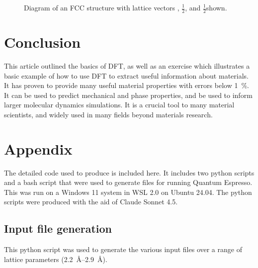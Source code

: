 \begin{figure}[t]
\centering

\caption{Diagram of an FCC structure with lattice vectors
\hkl[011], $\frac{1}{2}$\hkl[101], and $\frac{1}{2}$\hkl[110] shown.}
\label{fig:fcc}
\end{figure}

\section{Conclusion}

This article outlined the basics of DFT, as well as an
exercise which illustrates a basic example of how to use DFT to extract useful
information about materials. It has proven to provide
many useful material properties with errors below \SI{1}{\percent}. It can be
used to predict mechanical and phase properties, and be used to inform
larger molecular dynamics simulations. It is a crucial tool to many material
scientists, and widely used in many fields beyond materials research.

\pagebreak

\printbibliography

\pagebreak

\section{Appendix}
\label{sec:appendix}

The detailed code used to produce  is included
here. It includes
two python scripts and a bash script that were used to generate files for
running Quantum Espresso. This was run on a Windows 11 system in WSL 2.0
on Ubuntu 24.04. The python scripts were produced with
the aid of Claude Sonnet 4.5.

\pagebreak

\subsection{Input file generation}

This python script was used to generate the various input files
over a range of lattice parameters (\SI{2.2}{\angstrom}--\SI{2.9}{\angstrom}).

\begin{tcolorbox}[colback=gray!10, colframe=gray!30, boxrule=0.5pt, breakable]
\begin{center}
  \inputminted[linenos,
  numbersep=8pt, fontsize=\small]{python}{./calculations/generate_files.py}
\end{center}
\end{tcolorbox}

